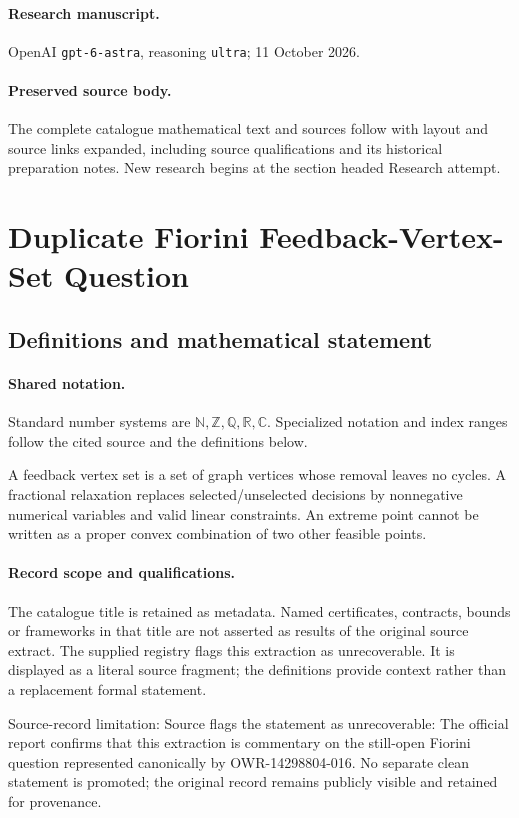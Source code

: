 \documentclass[11pt]{article}
\begin{document}
\paragraph{Research manuscript.} OpenAI \texttt{gpt-6-astra}, reasoning \texttt{ultra}; 11 October 2026.
\paragraph{Preserved source body.} The complete catalogue mathematical text and sources follow with layout and source links expanded, including source qualifications and its historical preparation notes. New research begins at the section headed Research attempt.

\section{Duplicate Fiorini Feedback-Vertex-Set Question}\label{statement}

\subsection{Definitions and mathematical statement}

\paragraph{Shared notation.}Standard number systems are $\mathbb N,\mathbb Z,\mathbb Q,\mathbb R,\mathbb C$. Specialized notation and index ranges follow the cited source and the definitions below.


A feedback vertex set is a set of graph vertices whose removal leaves no cycles. A fractional relaxation replaces selected/unselected decisions by nonnegative numerical variables and valid linear constraints. An extreme point cannot be written as a proper convex combination of two other feasible points.
\paragraph{Record scope and qualifications.}
The catalogue title is retained as metadata. Named certificates, contracts, bounds or frameworks in that title are not asserted as results of the original source extract.
The supplied registry flags this extraction as unrecoverable. It is displayed as a literal source fragment; the definitions provide context rather than a replacement formal statement.

Source-record limitation: Source flags the statement as unrecoverable: The official report confirms that this extraction is commentary on the still-open Fiorini question represented canonically by OWR-14298804-016. No separate clean statement is promoted; the original record remains publicly visible and retained for provenance.
\end{document}
